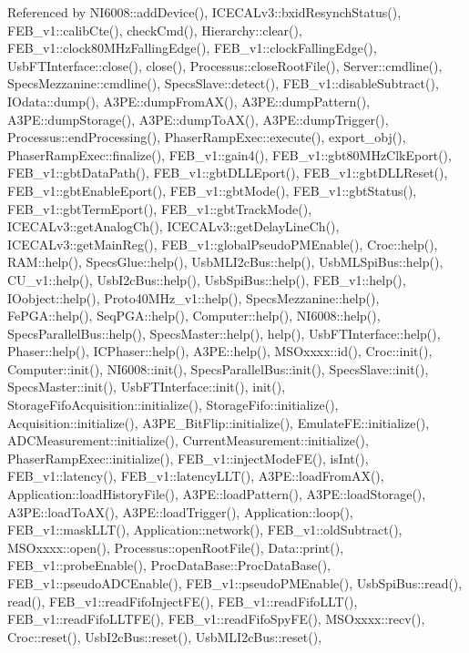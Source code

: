Referenced by N\+I6008\+::add\+Device(), I\+C\+E\+C\+A\+Lv3\+::bxid\+Resynch\+Status(), F\+E\+B\+\_\+v1\+::calib\+Cte(), check\+Cmd(), Hierarchy\+::clear(), F\+E\+B\+\_\+v1\+::clock80\+M\+Hz\+Falling\+Edge(), F\+E\+B\+\_\+v1\+::clock\+Falling\+Edge(), Usb\+F\+T\+Interface\+::close(), close(), Processus\+::close\+Root\+File(), Server\+::cmdline(), Specs\+Mezzanine\+::cmdline(), Specs\+Slave\+::detect(), F\+E\+B\+\_\+v1\+::disable\+Subtract(), I\+Odata\+::dump(), A3\+P\+E\+::dump\+From\+A\+X(), A3\+P\+E\+::dump\+Pattern(), A3\+P\+E\+::dump\+Storage(), A3\+P\+E\+::dump\+To\+A\+X(), A3\+P\+E\+::dump\+Trigger(), Processus\+::end\+Processing(), Phaser\+Ramp\+Exec\+::execute(), export\+\_\+obj(), Phaser\+Ramp\+Exec\+::finalize(), F\+E\+B\+\_\+v1\+::gain4(), F\+E\+B\+\_\+v1\+::gbt80\+M\+Hz\+Clk\+Eport(), F\+E\+B\+\_\+v1\+::gbt\+Data\+Path(), F\+E\+B\+\_\+v1\+::gbt\+D\+L\+L\+Eport(), F\+E\+B\+\_\+v1\+::gbt\+D\+L\+L\+Reset(), F\+E\+B\+\_\+v1\+::gbt\+Enable\+Eport(), F\+E\+B\+\_\+v1\+::gbt\+Mode(), F\+E\+B\+\_\+v1\+::gbt\+Status(), F\+E\+B\+\_\+v1\+::gbt\+Term\+Eport(), F\+E\+B\+\_\+v1\+::gbt\+Track\+Mode(), I\+C\+E\+C\+A\+Lv3\+::get\+Analog\+Ch(), I\+C\+E\+C\+A\+Lv3\+::get\+Delay\+Line\+Ch(), I\+C\+E\+C\+A\+Lv3\+::get\+Main\+Reg(), F\+E\+B\+\_\+v1\+::global\+Pseudo\+P\+M\+Enable(), Croc\+::help(), R\+A\+M\+::help(), Specs\+Glue\+::help(), Usb\+M\+L\+I2c\+Bus\+::help(), Usb\+M\+L\+Spi\+Bus\+::help(), C\+U\+\_\+v1\+::help(), Usb\+I2c\+Bus\+::help(), Usb\+Spi\+Bus\+::help(), F\+E\+B\+\_\+v1\+::help(), I\+Oobject\+::help(), Proto40\+M\+Hz\+\_\+v1\+::help(), Specs\+Mezzanine\+::help(), Fe\+P\+G\+A\+::help(), Seq\+P\+G\+A\+::help(), Computer\+::help(), N\+I6008\+::help(), Specs\+Parallel\+Bus\+::help(), Specs\+Master\+::help(), help(), Usb\+F\+T\+Interface\+::help(), Phaser\+::help(), I\+C\+Phaser\+::help(), A3\+P\+E\+::help(), M\+S\+Oxxxx\+::id(), Croc\+::init(), Computer\+::init(), N\+I6008\+::init(), Specs\+Parallel\+Bus\+::init(), Specs\+Slave\+::init(), Specs\+Master\+::init(), Usb\+F\+T\+Interface\+::init(), init(), Storage\+Fifo\+Acquisition\+::initialize(), Storage\+Fifo\+::initialize(), Acquisition\+::initialize(), A3\+P\+E\+\_\+\+Bit\+Flip\+::initialize(), Emulate\+F\+E\+::initialize(), A\+D\+C\+Measurement\+::initialize(), Current\+Measurement\+::initialize(), Phaser\+Ramp\+Exec\+::initialize(), F\+E\+B\+\_\+v1\+::inject\+Mode\+F\+E(), is\+Int(), F\+E\+B\+\_\+v1\+::latency(), F\+E\+B\+\_\+v1\+::latency\+L\+L\+T(), A3\+P\+E\+::load\+From\+A\+X(), Application\+::load\+History\+File(), A3\+P\+E\+::load\+Pattern(), A3\+P\+E\+::load\+Storage(), A3\+P\+E\+::load\+To\+A\+X(), A3\+P\+E\+::load\+Trigger(), Application\+::loop(), F\+E\+B\+\_\+v1\+::mask\+L\+L\+T(), Application\+::network(), F\+E\+B\+\_\+v1\+::old\+Subtract(), M\+S\+Oxxxx\+::open(), Processus\+::open\+Root\+File(), Data\+::print(), F\+E\+B\+\_\+v1\+::probe\+Enable(), Proc\+Data\+Base\+::\+Proc\+Data\+Base(), F\+E\+B\+\_\+v1\+::pseudo\+A\+D\+C\+Enable(), F\+E\+B\+\_\+v1\+::pseudo\+P\+M\+Enable(), Usb\+Spi\+Bus\+::read(), read(), F\+E\+B\+\_\+v1\+::read\+Fifo\+Inject\+F\+E(), F\+E\+B\+\_\+v1\+::read\+Fifo\+L\+L\+T(), F\+E\+B\+\_\+v1\+::read\+Fifo\+L\+L\+T\+F\+E(), F\+E\+B\+\_\+v1\+::read\+Fifo\+Spy\+F\+E(), M\+S\+Oxxxx\+::recv(), Croc\+::reset(), Usb\+I2c\+Bus\+::reset(), Usb\+M\+L\+I2c\+Bus\+::reset(), 